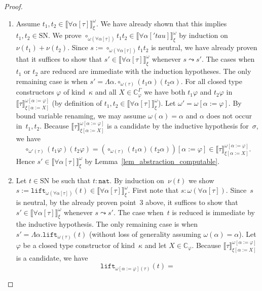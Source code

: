 \documentclass[runningheads,a4paper]{llncs}
\newcommand{\tabs}[2]{\Lambda #1.#2}
\newcommand{\subst}[2]{#1:=#2}
\newcommand{\nat}{\mathtt{nat}}
\newcommand{\lift}{\mathtt{lift}}
\newcommand{\SN}{\mathrm{SN}}
\newcommand{\Cb}{\mathbb{C}}
\newcommand{\val}[3]{\ensuremath{\llbracket#1\rrbracket_{#2}^{#3}}}
\begin{document}
\begin{proof}
\begin{enumerate}
  \item Assume $t_1,t_2 \in
    \val{\forall\alpha[\tau]}{\xi}{\omega}$. We have already shown
    that this implies $t_1,t_2 \in \SN$. We prove
    $\circ_{\omega(\forall\alpha[\tau])} t_1 t_2 \in
    \val{\forall\alpha['tau]}{\xi}{\omega}$ by induction on $\nu(t_1)
    + \nu(t_2)$. Since $s := \circ_{\omega(\forall\alpha[\tau])} t_1
    t_2$ is neutral, we have already proven that it suffices to show
    that $s' \in \val{\forall\alpha[\tau]}{\xi}{\omega}$ whenever $s
    \leadsto s'$. The cases when $t_1$ or $t_2$ are reduced are
    immediate with the induction hypotheses. The only remaining case
    is when $s'=\tabs{\alpha}{\circ_{\omega(\tau)} (t_1 \alpha) (t_2
      \alpha)}$.  For all closed type constructors $\varphi$ of
    kind~$\kappa$ and all $X \in \Cb_{\varphi}^\Gamma$ we have both
    $t_1 \varphi$ and $t_2 \varphi$ in
    $\val{\tau}{\xi[\subst{\alpha}{X}]}{\omega[\subst{\alpha}{\varphi}]}$
    (by definition of $t_1,t_2 \in
    \val{\forall\alpha[\tau]}{\xi}{\omega}$). Let $\omega' =
    \omega[\subst{\alpha}{\varphi}]$. By bound variable renaming, we
    may assume $\omega(\alpha) = \alpha$ and $\alpha$ does not occur
    in~$t_1,t_2$. Because
    $\val{\tau}{\xi[\subst{\alpha}{X}]}{\omega[\subst{\alpha}{\varphi}]}$
    is a candidate by the inductive hypothesis for~$\sigma$, we have
    \[
    \circ_{\omega'(\tau)} (t_1 \varphi)
    (t_2\varphi) = (\circ_{\omega(\tau)} (t_1 \alpha) (t_2
    \alpha))[\subst{\alpha}{\varphi}] \in
    \val{\tau}{\xi[\subst{\alpha}{X}]}{\omega[\subst{\alpha}{\varphi}]}.
    \]
    Hence $s' \in \val{\forall\alpha[\tau]}{\xi}{\omega}$ by
    Lemma~\ref{lem_abstraction_computable}.
  \item Let $t \in \SN$ be such that $t : \nat$. By induction
    on~$\nu(t)$ we show $s := \lift_{\omega(\forall\alpha[\tau])}(t)
    \in \val{\forall\alpha[\tau]}{\xi}{\omega}$. First note that $s :
    \omega(\forall\alpha[\tau])$. Since~$s$ is neutral, by the already
    proven point~3 above, it suffices to show that $s' \in
    \val{\forall\alpha[\tau]}{\xi}{\omega}$ whenever $s \leadsto
    s'$. The case when~$t$ is reduced is immediate by the inductive
    hypothesis. The only remaining case is when $s' =
    \tabs{\alpha}{\lift_{\omega(\tau)}(t)}$ (without loss of
    generality assuming $\omega(\alpha) = \alpha$). Let $\varphi$ be a
    closed type constructor of kind~$\kappa$ and let $X \in
    \Cb_\varphi$. Because
    $\val{\tau}{\xi[\subst{\alpha}{X}]}{\omega[\subst{\alpha}{\varphi}]}$
    is a candidate, we have
    \[
    \lift_{\omega[\subst{\alpha}{\varphi}](\tau)}(t) =
\]
\end{enumerate}
\end{proof}
\end{document}
